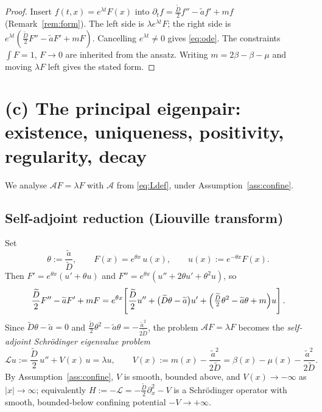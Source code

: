 \documentclass{amsart}
\theoremstyle{definition}
\begin{document}
\begin{proof}
Insert $f(t,x)=e^{\lambda t}F(x)$ into
$\partial_t f = \frac{\widetilde D}{2} f'' - \widetilde a f' + m f$ (Remark~\ref{rem:form}).
The left side is $\lambda e^{\lambda t}F$; the right side is
$e^{\lambda t}(\frac{\widetilde D}{2}F'' - \widetilde a F' + m F)$. Cancelling
$e^{\lambda t}\neq0$ gives \eqref{eq:ode}. The constraints $\int F=1$, $F\to0$ are inherited
from the ansatz. Writing $m=2\beta-\beta-\mu$ and moving $\lambda F$ left gives the stated form.
\end{proof}

\section{(c) The principal eigenpair: existence, uniqueness, positivity, regularity, decay}
\label{sec:c}

We analyse $\mathcal{A}F=\lambda F$ with $\mathcal A$ from \eqref{eq:Ldef}, under
Assumption~\ref{ass:confine}.

\subsection*{Self-adjoint reduction (Liouville transform)}
Set
\begin{equation}\label{eq:gauge}
\theta:=\frac{\widetilde a}{\widetilde D},\qquad
F(x)=e^{\theta x}\,u(x),\qquad u(x):=e^{-\theta x}F(x).
\end{equation}
Then $F'=e^{\theta x}(u'+\theta u)$ and $F''=e^{\theta x}(u''+2\theta u'+\theta^2 u)$, so
\[
\frac{\widetilde D}{2}F''-\widetilde a F'+mF
= e^{\theta x}\!\left[\frac{\widetilde D}{2}u'' + \bigl(\widetilde D\theta-\widetilde a\bigr)u'
+\Bigl(\tfrac{\widetilde D}{2}\theta^2-\widetilde a\theta+m\Bigr)u\right].
\]
Since $\widetilde D\theta-\widetilde a=0$ and
$\frac{\widetilde D}{2}\theta^2-\widetilde a\theta=-\frac{\widetilde a^2}{2\widetilde D}$,
the problem $\mathcal A F=\lambda F$ becomes the \emph{self-adjoint Schr\"odinger eigenvalue problem}
\begin{equation}\label{eq:schrod}
\mathcal L u:=\frac{\widetilde D}{2}\,u'' + V(x)\,u = \lambda u,
\qquad
V(x):=m(x)-\frac{\widetilde a^2}{2\widetilde D}=\beta(x)-\mu(x)-\frac{\widetilde a^2}{2\widetilde D}.
\end{equation}
By Assumption~\ref{ass:confine}, $V$ is smooth, bounded above, and $V(x)\to-\infty$ as
$|x|\to\infty$; equivalently $H:=-\mathcal L=-\frac{\widetilde D}{2}\partial_x^2-V$ is a
Schr\"odinger operator with smooth, bounded-below confining potential $-V\to+\infty$.
\end{document}
